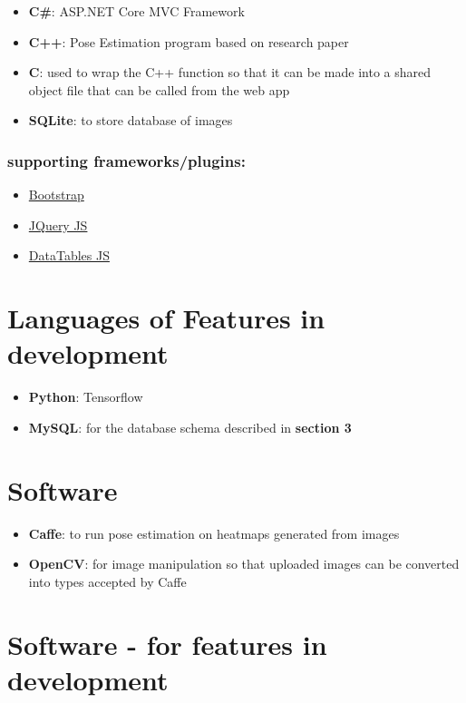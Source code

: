 \documentclass{scrreprt}
\begin{document}
\begin{itemize}
    \item \textbf{C\#}: ASP.NET Core MVC Framework
    \item \textbf{C++}: Pose Estimation program based on research paper
    \item \textbf{C}: used to wrap the C++ function so that it can be made into a shared object file that can be called from the web app
    \item \textbf{SQLite}: to store database of images
\end{itemize}

\subsubsection{supporting frameworks/plugins:}

\begin{itemize}
    \item \href{http://getbootstrap.com/}{Bootstrap}
    \item \href{https://jquery.com/}{JQuery JS}
    \item \href{https://datatables.net/}{DataTables JS}
\end{itemize}

\section{Languages of Features in development}

\begin{itemize}
    \item \textbf{Python}: Tensorflow
    \item \textbf{MySQL}: for the database schema described in \textbf{section 3}

\end{itemize}

\section{Software}

\begin{itemize}
    \item \textbf{Caffe}: to run pose estimation on heatmaps generated from images
    \item \textbf{OpenCV}: for image manipulation so that uploaded images can be converted into types accepted by Caffe
\end{itemize}

\section{Software - for features in development}
\end{document}
